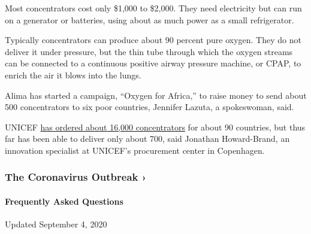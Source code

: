 Most concentrators cost only \$1,000 to \$2,000. They need electricity
but can run on a generator or batteries, using about as much power as a
small refrigerator.

Typically concentrators can produce about 90 percent pure oxygen. They
do not deliver it under pressure, but the thin tube through which the
oxygen streams can be connected to a continuous positive airway pressure
machine, or CPAP, to enrich the air it blows into the lungs.

Alima has started a campaign, ``Oxygen for Africa,'' to raise money to
send about 500 concentrators to six poor countries, Jennifer Lazuta, a
spokeswoman, said.

UNICEF \href{https://www.unicef.org/innovation/oxygen-therapy}{has
ordered about 16,000 concentrators} for about 90 countries, but thus far
has been able to deliver only about 700, said Jonathan Howard-Brand, an
innovation specialist at UNICEF's procurement center in Copenhagen.

\href{https://www.nytimes3xbfgragh.onion/news-event/coronavirus?action=click\&pgtype=Article\&state=default\&region=MAIN_CONTENT_3\&context=storylines_faq}{}

\hypertarget{the-coronavirus-outbreak-}{%
\subsubsection{The Coronavirus Outbreak
›}\label{the-coronavirus-outbreak-}}

\hypertarget{frequently-asked-questions}{%
\paragraph{Frequently Asked
Questions}\label{frequently-asked-questions}}

Updated September 4, 2020

